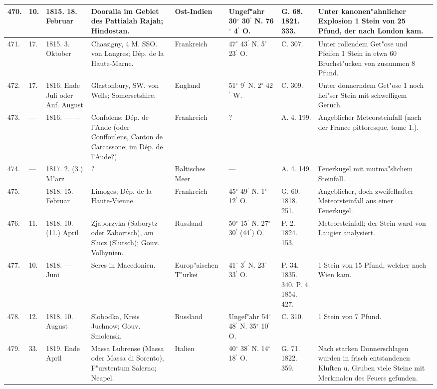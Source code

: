 \documentclass[a4paper, 8pt, oneside, polutonikogreek, german]{article}
\begin{document}
\begin{center}
\begin{longtable}{| p{5mm} | p{3mm} | p{15mm} | p{25mm} | p{20mm} | p{14mm} | p{17mm} | p{24mm} |}
        470. & 10. & 1815. 18. Februar & Dooralla im Gebiet des Pattialah Rajah; Hindostan. & Ost-Indien & Ungef"ahr 30$^\circ$ 30$^\prime$ N. 76$^\circ$ 4$^\prime$ O. & G. 68. 1821. 333. & Unter kanonen"ahnlicher Explosion 1 Stein von 25 Pfund, der nach London kam. \\ \hline
        471. & 17. & 1815. 3. Oktober & Chassigny, 4 M. SSO. von Langres; Dép. de la Haute-Marne. & Frankreich & 47$^\circ$ 43$^\prime$ N. 5$^\circ$ 23$^\prime$ O. & C. 307. & Unter rollendem Get"ose und Pfeifen 1 Stein in etwa 60 Bruchst"ucken von zusammen 8 Pfund. \\ \hline
        472. & 17. & 1816. Ende Juli oder Anf. August & Glastonbury, SW. von Wells; Somersetshire. & England & 51$^\circ$ 9$^\prime$ N. 2$^\circ$ 42$^\prime$ W. & C. 309. & Unter donnerndem Get"ose 1 noch hei"ser Stein mit schwefligem Geruch. \\ \hline
        473. & --- & 1816. --- --- & Confolens; Dép. de l’Ande (oder Conffoulens, Canton de Carcassone; im Dép. de l’Aude?). & Frankreich & ? & A. 4. 199. & Angeblicher Meteorsteinfall (nach der France pittoresque, tome 1.). \\ \hline
        474. & --- & 1817. 2. (3.) M"arz & ? & Baltisches Meer & --- & A. 4. 149. & Feuerkugel mit mutma"slichem Steinfall. \\ \hline
        475. & --- & 1818. 15. Februar & Limoges; Dép. de la Haute-Vienne. & Frankreich & 45$^\circ$ 49$^\prime$ N. 1$^\circ$ 12$^\prime$ O. & G. 60. 1818. 251. & Angeblicher, doch zweifelhafter Meteorsteinfall aus einer Feuerkugel. \\ \hline
        476. & 11. & 1818. 10. (11.) April & Zjaborzyka (Saborytz oder Zabortsch), am Slucz (Slutsch); Gouv. Volhynien. & Russland & 50$^\circ$ 15$^\prime$ N. 27$^\circ$ 30$^\prime$ (44$^\prime$) O. & P. 2. 1824. 153. & Meteorsteinfall; der Stein ward von Laugier analysiert. \\ \hline
        477. & 10. & 1818. --- Juni & Seres in Macedonien. & Europ"aischen T"urkei & 41$^\circ$ 3$^\prime$ N. 23$^\circ$ 33$^\prime$ O. & P. 34. 1835. 340. P. 4. 1854. 427. & 1 Stein von 15 Pfund, welcher nach Wien kam. \\ \hline
        478. & 12. & 1818. 10. August & Slobodka, Kreis Juchnow; Gouv. Smolensk. & Russland & Ungef"ahr 54$^\circ$ 48$^\prime$ N. 35$^\circ$ 10$^\prime$ O. & C. 310. & 1 Stein von 7 Pfund. \\ \hline
        479. & 33. & 1819. Ende April & Massa Lubrense (Massa oder Massa di Sorento), F"urstentum Salerno; Neapel. & Italien & 40$^\circ$ 38$^\prime$ N. 14$^\circ$ 18$^\prime$ O. & G. 71. 1822. 359. & Nach starken Donnerschlagen wurden in frisch entstandenen Kluften u. Gruben viele Steine mit Merkmalen des Feuers gefunden. \\ \hline

\end{longtable}
\end{center}
\end{document}
